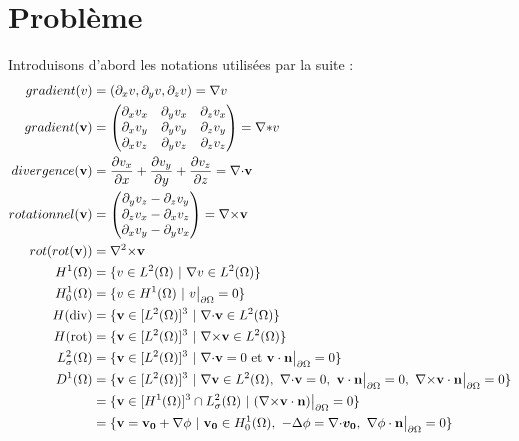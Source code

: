 \part{Problème}
\label{partProb}


Introduisons d'abord les notations utilisées par la suite :
\begin{align*}
gradient(v)&=(\partial_x v, \partial_y v, \partial_z v)=\grad v\\
gradient(\mathbf{v})&=\begin{pmatrix}
\partial_x v_x & \partial_y v_x & \partial_z v_x\\
\partial_x v_y & \partial_y v_y & \partial_z v_y\\
\partial_x v_z & \partial_y v_z & \partial_z v_z
\end{pmatrix}=\grad\mathbf*{v}\\
divergence(\mathbf{v})&=\frac{\partial v_x}{\partial x}+\frac{\partial v_y}{\partial y}+\frac{\partial v_z}{\partial z}=\div \mathbf{v}\\
rotationnel(\mathbf{v})&=\begin{pmatrix}
\partial_y v_z - \partial_z v_y\\
\partial_z v_x - \partial_x v_z\\
\partial_x v_y - \partial_y v_x
\end{pmatrix}=\rot \mathbf{v}\\
rot(rot(\mathbf{v}))&=\rott \mathbf{v}\\
H^1(\Omega) &= \{v \in L^2(\Omega)\ |\ \grad v\in L^2(\Omega)\}\\
H^1_0(\Omega) &= \{v \in H^1(\Omega)\ |\ v\restr = 0\}\\
H(\mathrm{div}) &= \{\mathbf{v} \in [L^2(\Omega)]^3\ |\ \div\mathbf{v} \in L^2(\Omega) \}\\
H(\mathrm{rot}) &= \{\mathbf{v} \in [L^2(\Omega)]^3\ |\ \rot\mathbf{v} \in L^2(\Omega) \}\\
L^2_\sigma(\Omega) &= \{\mathbf{v} \in [L^2(\Omega)]^3\ |\ \div \mathbf{v} = 0\text{ et }\mathbf{v}\cdot \mathbf{n}\restr = 0 \}\\
D^1(\Omega) &=\{\mathbf{v}\in [L^2(\Omega)]^3\ |\ \grad\mathbf{v}\in L^2(\Omega),\ \div\mathbf{v}=0,\ \mathbf{v}\cdot\mathbf{n}\restr = 0,\ \rot\mathbf{v}\cdot\mathbf{n}\restr = 0\}\\
&= \{\mathbf{v} \in [H^1(\Omega)]^3\cap L^2_\sigma(\Omega)\ |\ (\rot \mathbf{v}\cdot \mathbf{n})\restr = 0  \}\\
&=\{\mathbf{v}=\mathbf{v_0}+\grad\phi\ |\ \mathbf{v_0}\in H^1_0(\Omega),\ -\laplace\phi=\div\bm{v_0},\ \grad\phi\cdot \mathbf{n}\restr = 0 \}
\end{align*}

